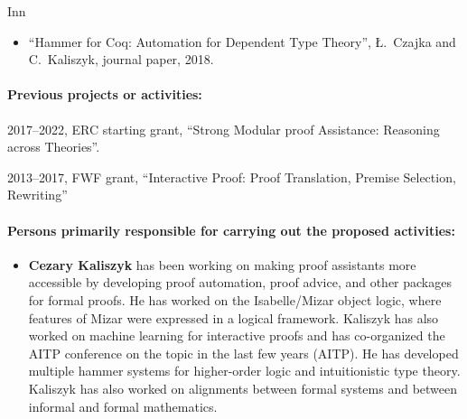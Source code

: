\begin{sitedescription}{Inn}
\begin{itemize}
\item ``Hammer for Coq: Automation for Dependent Type Theory'', Ł.~Czajka and C.~Kaliszyk, journal paper, 2018.
\end{itemize}

\paragraph*{Previous projects or activities:}

\begin{compactitem}
\item 2017--2022, ERC starting grant, ``Strong Modular proof Assistance: Reasoning across Theories''.
\item 2013--2017, FWF grant, ``Interactive Proof: Proof Translation, Premise Selection, Rewriting''
\end{compactitem}




\paragraph*{Persons primarily responsible for carrying out the proposed activities:}

\begin{itemize}
\item \textbf{Cezary Kaliszyk} has been working on making proof assistants
more accessible by developing proof automation, proof advice, and other packages for formal
proofs. He has worked on the Isabelle/Mizar object logic, where features of Mizar were
expressed in a logical framework. Kaliszyk has also worked on machine learning for interactive
proofs and has co-organized the AITP conference on the topic in the last few years (AITP). He
has developed multiple hammer systems for higher-order logic and intuitionistic type theory.
Kaliszyk has also worked on alignments between formal systems and between informal and formal
mathematics.
\end{itemize}



\end{sitedescription}

